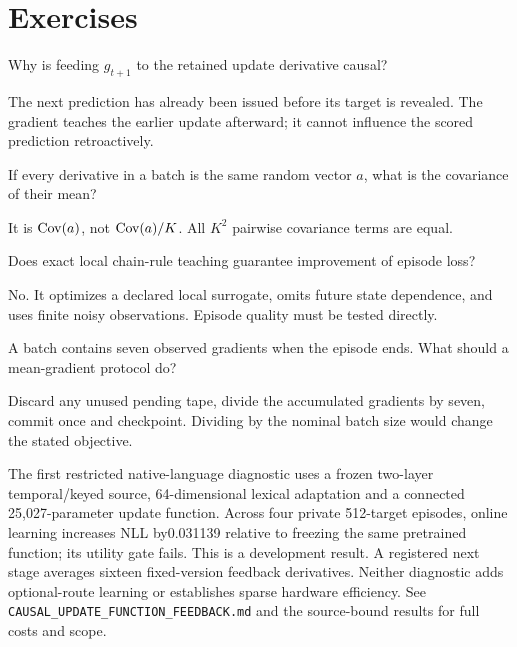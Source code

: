 \documentclass[11pt]{article}
\begin{document}
\section*{Exercises}
\begin{exercise}Why is feeding $g_{t+1}$ to the retained update derivative causal?\end{exercise}
\begin{solution}The next prediction has already been issued before its target is revealed. The gradient teaches the earlier update afterward; it cannot influence the scored prediction retroactively.\end{solution}
\begin{exercise}If every derivative in a batch is the same random vector $a$, what is the covariance of their mean?\end{exercise}
\begin{solution}It is $\operatorname{Cov}(a)$, not $\operatorname{Cov}(a)/K$. All $K^2$ pairwise covariance terms are equal.\end{solution}
\begin{exercise}Does exact local chain-rule teaching guarantee improvement of episode loss?\end{exercise}
\begin{solution}No. It optimizes a declared local surrogate, omits future state dependence, and uses finite noisy observations. Episode quality must be tested directly.\end{solution}
\begin{exercise}A batch contains seven observed gradients when the episode ends. What should a mean-gradient protocol do?\end{exercise}
\begin{solution}Discard any unused pending tape, divide the accumulated gradients by seven, commit once and checkpoint. Dividing by the nominal batch size would change the stated objective.\end{solution}
\begin{inourmodels}
The first restricted native-language diagnostic uses a frozen two-layer temporal/keyed source, 64-dimensional lexical adaptation and a connected 25,027-parameter update function. Across four private 512-target episodes, online learning increases NLL by0.031139 relative to freezing the same pretrained function; its utility gate fails. This is a development result. A registered next stage averages sixteen fixed-version feedback derivatives. Neither diagnostic adds optional-route learning or establishes sparse hardware efficiency. See \texttt{CAUSAL\_UPDATE\_FUNCTION\_FEEDBACK.md} and the source-bound results for full costs and scope.
\end{inourmodels}
\end{document}
